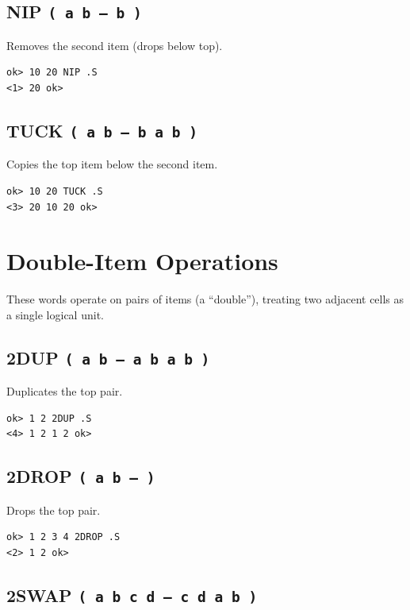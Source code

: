 \subsection*{NIP \texttt{( a b -- b )}}

Removes the second item (drops below top).

\begin{lstlisting}[language=Forth]
ok> 10 20 NIP .S
<1> 20 ok>
\end{lstlisting}

\subsection*{TUCK \texttt{( a b -- b a b )}}

Copies the top item below the second item.

\begin{lstlisting}[language=Forth]
ok> 10 20 TUCK .S
<3> 20 10 20 ok>
\end{lstlisting}

\section{Double-Item Operations}
\label{sec:double-stack}

These words operate on pairs of items (a ``double''), treating two adjacent
cells as a single logical unit.

\subsection*{2DUP \texttt{( a b -- a b a b )}}

Duplicates the top pair.

\begin{lstlisting}[language=Forth]
ok> 1 2 2DUP .S
<4> 1 2 1 2 ok>
\end{lstlisting}

\subsection*{2DROP \texttt{( a b -- )}}

Drops the top pair.

\begin{lstlisting}[language=Forth]
ok> 1 2 3 4 2DROP .S
<2> 1 2 ok>
\end{lstlisting}

\subsection*{2SWAP \texttt{( a b c d -- c d a b )}}

